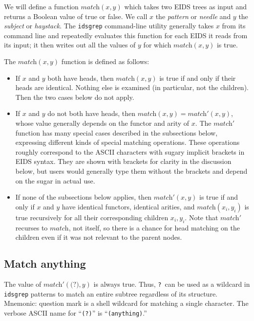 \documentclass[twocolumn]{report}
\begin{document}
We will define a function $\textit{match}(x,y)$ which takes two EIDS trees
as input and returns a Boolean value of true or false.  We
call $x$ the \emph{pattern} or \emph{needle} and $y$ the \emph{subject} or
\emph{haystack}.  The \texttt{idsgrep} command-line utility generally takes
$x$ from its command line and repeatedly evaluates this function for each
EIDS it reads from its input; it then writes out all the values of $y$ for
which $\textit{match}(x,y)$ is true.

The $\textit{match}(x,y)$ function is defined as follows:
\begin{itemize}
  \item If $x$ and $y$ both have heads, then $\textit{match}(x,y)$ is true
    if and only if their heads are identical.  Nothing else is examined (in
    particular, not the children).  Then the two cases below do not apply.
  \item If $x$ and $y$ do not both have heads, then
    $\textit{match}(x,y)=\textit{match}'(x,y)$, whose value
    generally depends on the functor and arity of $x$.  The
    $\textit{match}'$ function has many special cases described in the
    subsections below, expressing different kinds of special matching
    operations.  These operations roughly correspond to the ASCII
    characters with sugary implicit brackets in EIDS syntax.  They are
    shown with brackets for clarity in the discussion below, but users
    would generally type them without the brackets and depend on the
    sugar in actual use.
  \item If none of the subsections below applies, then
    $\textit{match}'(x,y)$ is true if and only if $x$ and $y$ have identical
    functors, identical arities, and $\textit{match}(x_i,y_i)$ is true
    recursively for all their corresponding children $x_i,y_i$.  Note that
    $\textit{match}'$ recurses to $\textit{match}$, not itself, so
    there is a chance for head matching on the children even if it was
    not relevant to the parent nodes.
\end{itemize}

\subsection{Match anything}

The value of $\textit{match}'(\texttt{(?)},y)$ is always true.  Thus,
\texttt{?}\ can be used as a wildcard in \texttt{idsgrep} patterns to match
an entire subtree regardless of its structure.  Mnemonic:  question mark
is a shell wildcard for matching a single character.
The verbose ASCII name for ``\texttt{(?)}'' is ``\texttt{(anything)}.''
\end{document}
